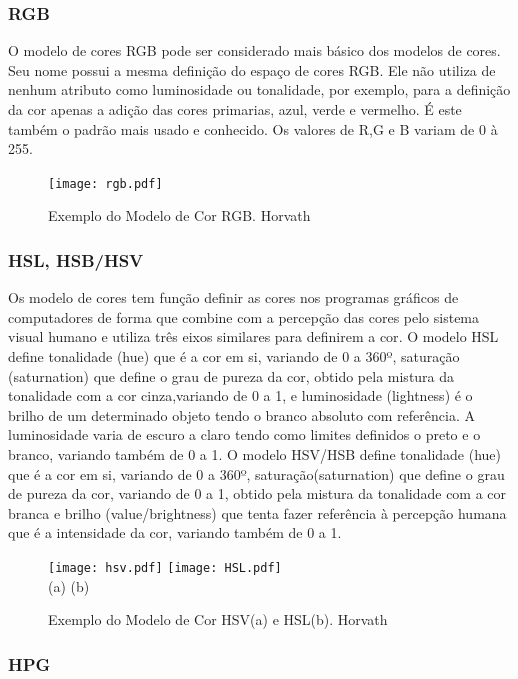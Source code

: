 \subsubsection{RGB}
O modelo de cores RGB pode ser considerado mais básico dos modelos de cores. Seu nome possui a mesma definição do espaço de cores RGB. Ele não utiliza de nenhum atributo como luminosidade ou tonalidade, por exemplo, para a definição da cor apenas a adição das cores primarias, azul, verde e vermelho. É este também o padrão mais usado e conhecido. Os valores de R,G e B variam de 0 à 255.
\begin{figure}[!h]
	\centering
	\texttt{[image: rgb.pdf]}
	
	\caption{Exemplo do Modelo de Cor RGB.	 Horvath\cite{ImagensHSLHSVRGB}  }
	\label{ModeloRGB}
\end{figure}
\subsubsection{HSL, HSB/HSV}
Os modelo de cores tem função definir as cores nos programas gráficos de computadores de forma que combine com a 
percepção das cores pelo sistema visual humano e utiliza três eixos similares para definirem a cor\cite{Leao:2005}.
O modelo HSL define tonalidade (hue) que é a cor em si, variando de 0 a 360º, saturação (saturnation) que define o grau de pureza da cor, obtido pela mistura da tonalidade com a cor cinza,variando de 0 a 1, e luminosidade (lightness) é o brilho de um determinado objeto tendo o branco absoluto com referência. A luminosidade varia de escuro a claro tendo como limites definidos o preto e o branco\cite{Leao:2005}, variando também de 0 a 1.
O modelo HSV/HSB define tonalidade (hue) que é a cor em si, variando de 0 a 360º, saturação(saturnation) que define o grau de pureza da cor, variando de 0 a 1, obtido pela mistura da tonalidade com a cor branca e brilho (value/brightness) que tenta fazer referência à percepção humana\cite{Leao:2005} que é a intensidade da cor, variando também de 0 a 1.
\begin{figure}[!h]
	\centering
	\texttt{[image: hsv.pdf]}
	\texttt{[image: HSL.pdf]} \\
	(a) \hspace{10cm} (b)
	\caption{Exemplo do Modelo de Cor HSV(a) e HSL(b). Horvath\cite{ImagensHSLHSVRGB}}
	\label{ModeloHSV}
\end{figure} 
\subsubsection{HPG} 

